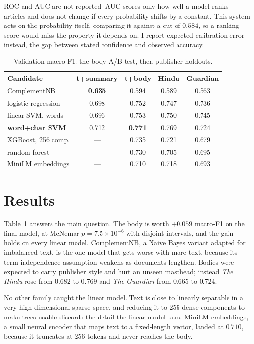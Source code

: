 \documentclass[conference]{IEEEtran}
\begin{document}
ROC and AUC are not reported. AUC scores only how well a model ranks articles and does not
change if every probability shifts by a constant. This system acts on the probability
itself, comparing it against a cut of $0.584$, so a ranking score would miss the property
it depends on. I report expected calibration error instead, the gap between stated
confidence and observed accuracy.
\begin{table}[!tb]
\caption{Validation macro-F1: the body A/B test, then publisher holdouts.}
\label{tab:ladder}
\centering
\footnotesize
\setlength{\tabcolsep}{3.5pt}
\begin{tabular}{lcccc}
\toprule
Candidate & t+summary & t+body & Hindu & Guardian \\
\midrule
ComplementNB        & \textbf{0.635} & 0.594 & 0.589 & 0.563 \\
logistic regression & 0.698 & 0.752 & 0.747 & 0.736 \\
linear SVM, words   & 0.696 & 0.753 & 0.750 & 0.745 \\
\textbf{word+char SVM} & 0.712 & \textbf{0.771} & 0.769 & 0.724 \\
XGBoost, 256 comp.  & --- & 0.735 & 0.721 & 0.679 \\
random forest       & --- & 0.730 & 0.705 & 0.695 \\
MiniLM embeddings   & --- & 0.710 & 0.718 & 0.693 \\
\bottomrule
\end{tabular}
\end{table}

\section{Results}
\label{sec:results}

Table~\ref{tab:ladder} answers the main question. The body is worth $+0.059$ macro-F1 on
the final model, at McNemar $p = 7.5\times10^{-6}$ with disjoint intervals, and the gain
holds on every linear model. ComplementNB, a Naive Bayes variant adapted for imbalanced
text, is the one model that gets worse with more text, because its term-independence
assumption weakens as documents lengthen. Bodies were expected to carry publisher style
and hurt an unseen masthead; instead \textit{The Hindu} rose from $0.682$ to $0.769$ and
\textit{The Guardian} from $0.665$ to $0.724$.

No other family caught the linear model. Text is close to linearly separable in a very
high-dimensional sparse space, and reducing it to 256 dense components to make trees
usable discards the detail the linear model uses. MiniLM embeddings, a small neural
encoder that maps text to a fixed-length vector, landed at $0.710$, because it truncates
at 256 tokens and never reaches the body.
\end{document}
